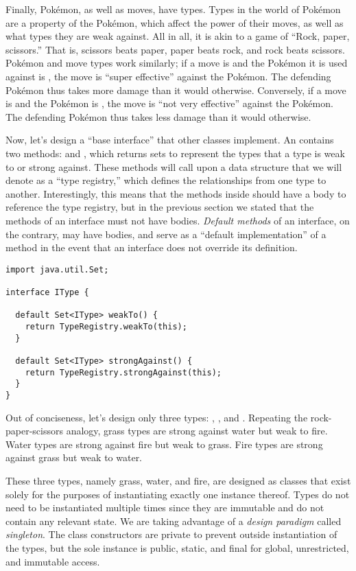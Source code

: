 Finally, Pok\'emon, as well as moves, have types. Types in the world of Pok\'emon are a property of the Pok\'emon, which affect the power of their moves, as well as what types they are weak against. All in all, it is akin to a game of ``Rock, paper, scissors.'' That is, scissors beats paper, paper beats rock, and rock beats scissors. Pok\'emon and move types work similarly; if a move is  and the Pok\'emon it is used against is , the move is ``super effective'' against the Pok\'emon. The defending Pok\'emon thus takes more damage than it would otherwise. Conversely, if a move is  and the Pok\'emon is , the move is ``not very effective'' against the Pok\'emon. The defending Pok\'emon thus takes less damage than it would otherwise. 

Now, let's design a ``base interface'' that other classes implement. An  contains two methods:  and , which returns sets to represent the types that a type is weak to or strong against. These methods will call upon a data structure that we will denote as a ``type registry,'' which defines the relationships from one type to another. Interestingly, this means that the methods inside  should have a body to reference the type registry, but in the previous section we stated that the methods of an interface must not have bodies. \emph{Default methods} of an interface, on the contrary, may have bodies, and serve as a ``default implementation'' of a method in the event that an interface does not override its definition.

\begin{lstlisting}[language=MyJava]
import java.util.Set;

interface IType {

  default Set<IType> weakTo() {
    return TypeRegistry.weakTo(this);
  }

  default Set<IType> strongAgainst() {
    return TypeRegistry.strongAgainst(this);
  }
}
\end{lstlisting}

Out of conciseness, let's design only three types: , , and . Repeating the rock-paper-scissors analogy, grass types are strong against water but weak to fire. Water types are strong against fire but weak to grass. Fire types are strong against grass but weak to water. 

These three types, namely grass, water, and fire, are designed as classes that exist solely for the purposes of instantiating exactly one instance thereof. Types do not need to be instantiated multiple times since they are immutable and do not contain any relevant state. We are taking advantage of a \emph{design paradigm} called \emph{singleton}. The class constructors are private to prevent outside instantiation of the types, but the sole instance is public, static, and final for global, unrestricted, and immutable access.

